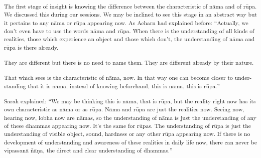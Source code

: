 \textsuperscript{\textdutch{The first stage of insight is knowing the
difference between the characteristic of nāma and of rūpa. We discussed
this during our sessions. We may be inclined to see this stage in an
abstract way but it pertains to any nāma or rūpa appearing now. As
Acharn had explained before: ``}\textenglish[variant=american]{Actually,
we don't even have to use the words
n}{{ā}}\textenglish[variant=american]{ma and
r}{{ū}}\textenglish[variant=american]{pa. When there is the
unders}\textdutch{t}\textenglish[variant=american]{anding of all kinds
of realities, those which experience an object and those which don't,
the understanding of n}{{ā}}\textenglish[variant=american]{ma and
r}{{ū}}\textenglish[variant=american]{pa is there already.}}

\textsuperscript{\textdutch{T}\textenglish[variant=american]{hey are
different but }\textdutch{there is }\textenglish[variant=american]{no
need to name them. They are different already by their nature. }}

\textsuperscript{\textenglish[variant=american]{That which sees is the
characteristic of n}\textdutch{ā}\textenglish[variant=american]{ma, now.
In that way one can become closer to understanding that it is
n}\textdutch{ā}\textenglish[variant=american]{ma, instead of knowing
beforehand, this is n}\textdutch{ā}\textenglish[variant=american]{ma,
this is r}\textdutch{ū}\textitalian{pa.}\textdutch{''}}

\textsuperscript{\textdutch{Sarah explained:
``}\textenglish[variant=american]{We may be thinking this is
n}\textdutch{ā}\textenglish[variant=american]{ma, that is
r}\textdutch{ū}\textenglish[variant=american]{pa, but the reality right
now has its own characteristic as
n}\textdutch{ā}\textenglish[variant=american]{ma or as
r}\textdutch{ū}\textitalian{pa.
}\textdutch{N}{{ā}}\textenglish[variant=american]{ma and
r}{{ū}}\textenglish[variant=american]{pa are just the realities now.
Seeing now, hearing now, lobha now are
n}{{ā}}\textenglish[variant=american]{mas, so the understanding of
n}{{ā}}\textenglish[variant=american]{ma is just the understanding of
any of these dhammas}\textdutch{
}\textenglish[variant=american]{appearing now. It's the same for
r}{{ū}}\textenglish[variant=american]{pas. The understanding of
r}{{ū}}\textenglish[variant=american]{pa is just the understanding of
visible object, sound, hardness or any other
r}{{ū}}\textenglish[variant=american]{pa appearing now.}\textdutch{
}\textenglish[variant=american]{If there is no development of
understanding and awareness of these realities in daily life now, there
can never be vipassan}{{ā}}
ñ{{ā}}\textdutch{ṇ}\textenglish[variant=american]{a, the direct and
clear understanding of dhammas.}\textdutch{''}}

